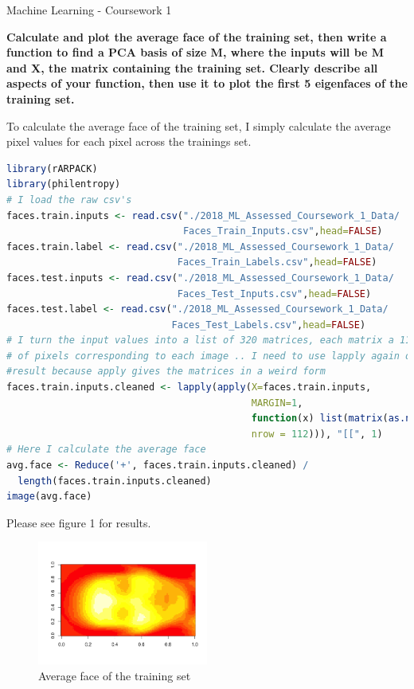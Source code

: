 \documentclass[11pt]{article}
\begin{document}
\pagestyle{fancyplain}
\cfoot{}{}
\begin{center} \Large
Machine Learning - Coursework 1 \\[4mm]
\end{center}
\textbf{Calculate and plot the average face of the training set, then write a function to find a PCA basis of size M, where the inputs will be M and X, the matrix containing the training set. Clearly describe all aspects of your function, then use it to plot the first 5 eigenfaces of the training set.}


To calculate the average face of the training set, I simply calculate the average pixel values for each pixel across the trainings set.
\begin{lstlisting}[linewidth=18.4cm,language=R]
library(rARPACK)
library(philentropy)
# I load the raw csv's
faces.train.inputs <- read.csv("./2018_ML_Assessed_Coursework_1_Data/
                               Faces_Train_Inputs.csv",head=FALSE)
faces.train.label <- read.csv("./2018_ML_Assessed_Coursework_1_Data/
                              Faces_Train_Labels.csv",head=FALSE)
faces.test.inputs <- read.csv("./2018_ML_Assessed_Coursework_1_Data/
                              Faces_Test_Inputs.csv",head=FALSE)
faces.test.label <- read.csv("./2018_ML_Assessed_Coursework_1_Data/
                             Faces_Test_Labels.csv",head=FALSE)
# I turn the input values into a list of 320 matrices, each matrix a 112 x 92 value 
# of pixels corresponding to each image .. I need to use lapply again on the 
#result because apply gives the matrices in a weird form
faces.train.inputs.cleaned <- lapply(apply(X=faces.train.inputs, 
                                           MARGIN=1, 
                                           function(x) list(matrix(as.numeric(x), 
                                           nrow = 112))), "[[", 1)
# Here I calculate the average face
avg.face <- Reduce('+', faces.train.inputs.cleaned) / 
  length(faces.train.inputs.cleaned)
image(avg.face)
\end{lstlisting}
Please see figure 1 for results. \\

\begin{figure}[b]
\caption{Average face of the training set}
\centering
\includegraphics[width=0.5\textwidth]{average}
\end{figure}
\end{document}
